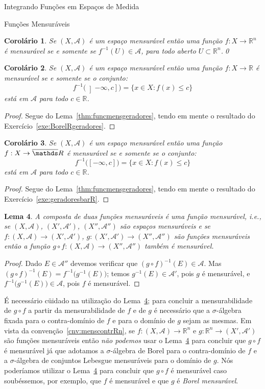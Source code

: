 \documentclass[oneside,final,11pt]{amsbook}
\newcommand{\R}{\mathds R}
\theoremstyle{remark}\newtheorem{exercise}{Exercício}[chapter]
\theoremstyle{remark}\newtheorem{*exercise}[exercise]{\hbox to 0pt{\hskip 0pt minus 1fil*}Exercício}
\theoremstyle{definition}\newtheorem{exdefin}{Definição}[chapter]
\theoremstyle{plain}\newtheorem{teo}{Teorema}[section]
\theoremstyle{plain}\newtheorem{lem}[teo]{Lema}
\theoremstyle{plain}\newtheorem{prop}[teo]{Proposição}
\theoremstyle{plain}\newtheorem{cor}[teo]{Corolário}
\theoremstyle{definition}\newtheorem{defin}[teo]{Definição}
\theoremstyle{remark}\newtheorem{rem}[teo]{Observação}
\theoremstyle{definition}\newtheorem{notation}[teo]{Notação}
\theoremstyle{definition}\newtheorem{convention}[teo]{Convenção}
\theoremstyle{definition}\newtheorem{example}[teo]{Exemplo}
\numberwithin{section}{chapter}
\numberwithin{equation}{section}
\begin{document}
\begin{chapter}{Integrando Funções em Espaços de Medida}
\begin{section}{Funções Mensuráveis}
\begin{cor}\label{thm:cormenscontrRn}
Se $(X,\mathcal A)$ é um espaço mensurável então uma função $f:X\to\R^n$ é mensurável se e somente se
$f^{-1}(U)\in\mathcal A$, para todo aberto $U\subset\R^n$.\qed
\end{cor}

\begin{cor}
Se $(X,\mathcal A)$ é um espaço mensurável então uma função $f:X\to\R$ é mensurável se e somente se o conjunto:
\[f^{-1}\big(\left]-\infty,c\right]\big)=\big\{x\in X:f(x)\le c\big\}\]
está em $\mathcal A$ para todo $c\in\R$.
\end{cor}
\begin{proof}
Segue do Lema~\ref{thm:funcmensgeradores}, tendo em mente o resultado do Exercício~\ref{exe:BorelRgeradores}.
\end{proof}

\begin{cor}\label{thm:cormenscontrbarR}
Se $(X,\mathcal A)$ é um espaço mensurável então uma função $f:X\to\overline\R$ é mensurável se e somente se o conjunto:
\[f^{-1}\big([-\infty,c]\big)=\big\{x\in X:f(x)\le c\big\}\]
está em $\mathcal A$ para todo $c\in\R$.
\end{cor}
\begin{proof}
Segue do Lema~\ref{thm:funcmensgeradores}, tendo em mente o resultado do Exercício~\ref{exe:geradoresbarR}.
\end{proof}

\begin{lem}\label{thm:compmens}
A composta de duas funções mensuráveis é uma função mensurável, i.e., se $(X,\mathcal A)$, $(X',\mathcal A')$, $(X'',\mathcal A'')$ são
espaços mensuráveis e se $f:(X,\mathcal A)\to(X',\mathcal A')$, $g:(X',\mathcal A')\to(X'',\mathcal A'')$ são funções
mensuráveis então a função $g\circ f:(X,\mathcal A)\to(X'',\mathcal A'')$ também é mensurável.
\end{lem}
\begin{proof}
Dado $E\in\mathcal A''$ devemos verificar que $(g\circ f)^{-1}(E)\in\mathcal A$. Mas $(g\circ f)^{-1}(E)=f^{-1}\big(g^{-1}(E)\big)$;
temos $g^{-1}(E)\in\mathcal A'$, pois $g$ é mensurável, e $f^{-1}\big(g^{-1}(E)\big)\in\mathcal A$, pois $f$ é mensurável.
\end{proof}
É necessário cüidado na utilização do Lema~\ref{thm:compmens}; para concluir a mensurabilidade
de $g\circ f$ a partir da mensurabilidade de $f$ e de $g$ é necessário que a $\sigma$-álgebra
fixada para o contra-domínio de $f$ e para o domínio de $g$ sejam as mesmas. Em vista da convenção~\ref{cnv:menscontrRn},
se $f:(X,\mathcal A)\to\R^n$ e $g:\R^n\to(X',\mathcal A')$ são funções mensuráveis então
{\em não podemos\/} usar o Lema~\ref{thm:compmens} para concluir que $g\circ f$ é mensurável
já que adotamos a $\sigma$-álgebra de Borel para o contra-domínio de $f$ e a $\sigma$-álgebra
de conjuntos Lebesgue mensuráveis para o domínio de $g$. Nós poderíamos utilizar o Lema~\ref{thm:compmens}
para concluir que $g\circ f$ é mensurável caso soubéssemos, por exemplo, que $f$ é mensurável e que $g$ é {\em Borel mensurável}.


\end{section}
\end{chapter}
\end{document}
